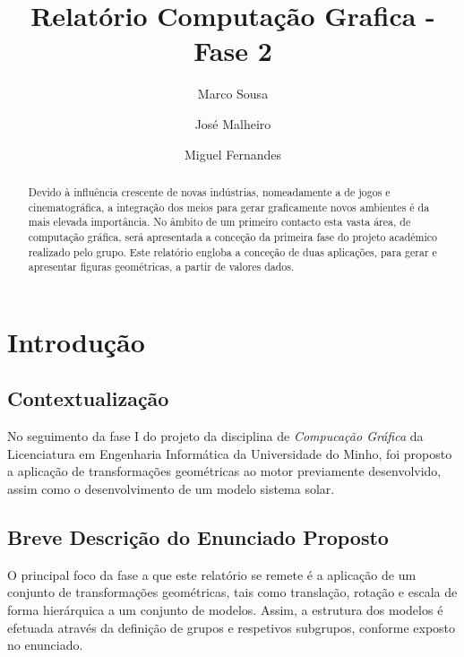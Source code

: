 \documentclass[runningheads]{llncs}
\begin{document}
%
\title{Relatório Computação Grafica - Fase 2}
\author{Marco Sousa \and
    José Malheiro \and
    Miguel Fernandes}
%
%
\maketitle              %
%
\begin{abstract}
    Devido à influência crescente de novas indústrias, nomeadamente a de jogos e cinematográfica, a integração dos meios para gerar graficamente novos ambientes é da mais elevada importância.
    No âmbito de um primeiro contacto esta vasta área, de computação gráfica, será apresentada a conceção da primeira fase do projeto académico realizado pelo grupo.
    Este relatório engloba a conceção de duas aplicações, para gerar e apresentar figuras geométricas, a partir de valores dados.
\end{abstract}

\section{Introdução}

\subsection{Contextualização}

No seguimento da fase I do projeto da disciplina de \textit{Compucação Gráfica} da Licenciatura em
Engenharia Informática da Universidade do Minho, foi proposto a aplicação de transformações geométricas
ao motor previamente desenvolvido, assim como o desenvolvimento de um modelo sistema solar.

\subsection{Breve Descrição do Enunciado Proposto}
O principal foco da fase a que este relatório se remete é a aplicação de um conjunto de transformações geométricas,
tais como translação, rotação e escala de forma hierárquica a um conjunto de modelos.
Assim, a estrutura dos modelos é efetuada através da definição de grupos e respetivos subgrupos,
conforme exposto no enunciado.
\end{document}
